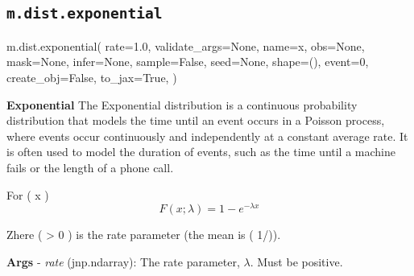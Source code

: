 \documentclass[
  letterpaper,
  DIV=11,
  numbers=noendperiod]{scrartcl}
\newenvironment{Shaded}{\begin{snugshade}}{\end{snugshade}}
\newcommand{\DecValTok}[1]{\textcolor[rgb]{0.68,0.00,0.00}{#1}}
\newcommand{\FloatTok}[1]{\textcolor[rgb]{0.68,0.00,0.00}{#1}}
\newcommand{\NormalTok}[1]{\textcolor[rgb]{0.00,0.23,0.31}{#1}}
\newcommand{\OperatorTok}[1]{\textcolor[rgb]{0.37,0.37,0.37}{#1}}
\newcommand{\StringTok}[1]{\textcolor[rgb]{0.13,0.47,0.30}{#1}}
\newcommand{\VariableTok}[1]{\textcolor[rgb]{0.07,0.07,0.07}{#1}}
\begin{document}
\subsection{\texorpdfstring{\texttt{m.dist.exponential}}{m.dist.exponential}}\label{exponential}

\begin{Shaded}
\begin{Highlighting}[]
\NormalTok{m.dist.exponential(}
\NormalTok{    rate}\OperatorTok{=}\FloatTok{1.0}\NormalTok{,}
\NormalTok{    validate\_args}\OperatorTok{=}\VariableTok{None}\NormalTok{,}
\NormalTok{    name}\OperatorTok{=}\StringTok{\textquotesingle{}x\textquotesingle{}}\NormalTok{,}
\NormalTok{    obs}\OperatorTok{=}\VariableTok{None}\NormalTok{,}
\NormalTok{    mask}\OperatorTok{=}\VariableTok{None}\NormalTok{,}
\NormalTok{    infer}\OperatorTok{=}\VariableTok{None}\NormalTok{,}
\NormalTok{    sample}\OperatorTok{=}\VariableTok{False}\NormalTok{,}
\NormalTok{    seed}\OperatorTok{=}\VariableTok{None}\NormalTok{,}
\NormalTok{    shape}\OperatorTok{=}\NormalTok{(),}
\NormalTok{    event}\OperatorTok{=}\DecValTok{0}\NormalTok{,}
\NormalTok{    create\_obj}\OperatorTok{=}\VariableTok{False}\NormalTok{,}
\NormalTok{    to\_jax}\OperatorTok{=}\VariableTok{True}\NormalTok{,}
\NormalTok{)}
\end{Highlighting}
\end{Shaded}

\textbf{Exponential} The Exponential distribution is a continuous
probability distribution that models the time until an event occurs in a
Poisson process, where events occur continuously and independently at a
constant average rate. It is often used to model the duration of events,
such as the time until a machine fails or the length of a phone call.

For ( x  ) \[   
  F(x; \lambda) = 1 - e^{-\lambda x}
  \]

Zhere ( \lambda \textgreater{} 0 ) is the rate parameter (the mean is (
1/\lambda )).

\textbf{Args} - \emph{rate} (jnp.ndarray): The rate parameter,
\(\lambda\). Must be positive.
\end{document}
